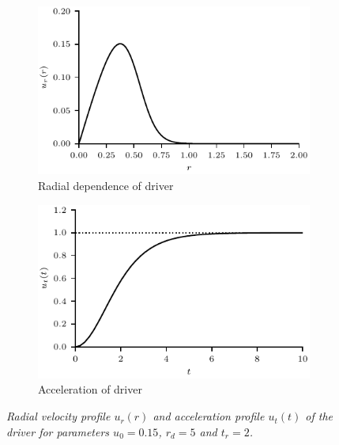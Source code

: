 \documentclass[12pt]{article}
\newcommand{\mycaption}[2]{\caption[#1]{\emph{#1} #2}}
\begin{document}
\begin{figure}[t]
  \centering
  \begin{subfigure}{.49\textwidth}
  \centering
  \includegraphics[width=1.0\linewidth]{u_r.pdf}
  \caption{Radial dependence of driver}
  \label{fig:kink_radial_driver}
  \end{subfigure}
  \begin{subfigure}{.49\textwidth}
  \centering
  \includegraphics[width=1.0\linewidth]{u_t.pdf}
  \caption{Acceleration of driver}
  \label{fig:kink_driver_accel}
  \end{subfigure}
  
  \mycaption{Radial velocity profile $u_r(r)$ and acceleration profile $u_t(t)$ of the driver for parameters $u_0 = 0.15$, $r_d = 5$ and $t_r = 2$.}{}
  \label{fig:kink_driver}
\end{figure}
\end{document}
